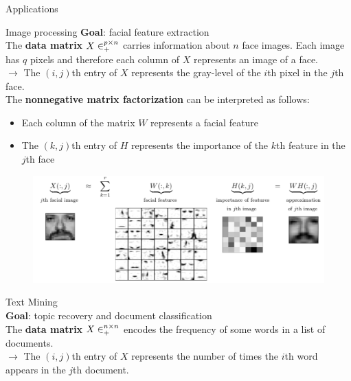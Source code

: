 \documentclass[final]{beamer}
\newlength{\twocolwid}
\newlength{\threecolwid}
\begin{document}
\begin{frame}
\begin{columns}[t]
\begin{column}{\threecolwid}
\begin{columns}[t]
\begin{column}{\twocolwid} %


\begin{exampleblock}{Applications}
\begin{block}{Image processing}
\textbf{Goal}: facial feature extraction\\
The \textbf{data matrix} $X\in\real^{p\times n}_+$ carries information about $n$ face images. Each image has $q$ pixels and therefore each column of $X$ represents an image of a face.\\
$\rightarrow$ The $(i,j)$th entry of $X$ represents the gray-level of the $i$th pixel in the $j$th face.\\
The \textbf{nonnegative matrix factorization} can be interpreted as follows:\\
\begin{itemize}
    \item Each column of the matrix $W$ represents a facial feature
    \item The $(k,j)$th entry of $H$ represents the importance of the $k$th feature in the $j$th face
\end{itemize}
\begin{figure}
    \centering
    \includegraphics{presentation/NMF_app1.png}
\end{figure}
\end{block}
\begin{block}{Text Mining}\\
\textbf{Goal}: topic recovery and document classification\\
The \textbf{data matrix} $X\in\real^{n\times n}_+$ encodes the frequency of some words in a list of documents.\\
$\rightarrow$ The $(i,j)$th entry of $X$ represents the number of times the $i$th word appears in the $j$th document.\\

\end{block}
\end{exampleblock}
\end{column}
\end{columns}
\end{column}
\end{columns}
\end{frame}
\end{document}
